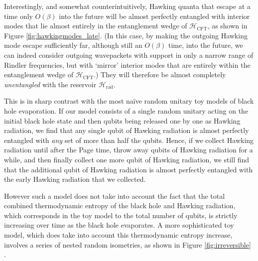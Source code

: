 \documentclass[12pt]{article}
\begin{document}
Interestingly, and somewhat counterintuitively, Hawking quanta that escape at a time only $O(\beta)$ into the future will be almost perfectly entangled with interior modes that lie almost entirely in the entanglement wedge of $\mathcal{H}_\text{CFT}$, as shown in Figure \ref{fig:hawkingmodes_late}. (In this case, by making the outgoing Hawking mode escape sufficiently far, although still an $O(\beta)$ time, into the future, we can indeed consider outgoing wavepackets with support in only a narrow range of Rindler frequencies, but with `mirror' interior modes that are entirely within the entanglement wedge of $\mathcal{H}_\text{CFT}$.) They will therefore be almost completely \emph{unentangled} with the reservoir $\mathcal{H}_\text{rad}$. 

This is in sharp contrast with the most na\"{i}ve random unitary toy models of black hole evaporation. If our model consists of a single random unitary acting on the initial black hole state and then qubits being released one by one as Hawking radiation, we find that any single qubit of Hawking radiation is almost perfectly entangled with \emph{any} set of more than half the qubits. Hence, if we collect Hawking radiation until after the Page time, throw away qubits of Hawking radiation for a while, and then finally collect one more qubit of Hawking radiation, we still find that the additional qubit of Hawking radiation is almost perfectly entangled with the early Hawking radiation that we collected.

However such a model does not take into account the fact that the total combined thermodynamic entropy of the black hole and Hawking radiation, which corresponds in the toy model to the total number of qubits, is strictly increasing over time as the black hole evaporates. A more sophisticated toy model, which does take into account this thermodynamic entropy increase, involves a series of nested random isometries, as shown in Figure \ref{fig:irreversible} \cite{hayden2018learning}. 
\end{document}

